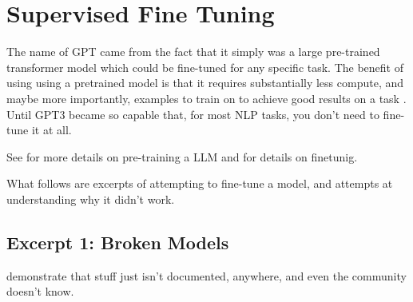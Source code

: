 



\section{Supervised Fine Tuning}\label{sec:sft}
The name of \acrfull{GPT} came from the fact that it simply was a large pre-trained transformer model which could be fine-tuned for any specific task.
The benefit of using using a pretrained model is that it requires substantially less compute, and maybe more importantly, examples to train on to achieve good results on a task \cite{gaddipati_comparative_2020}.
Until \gls{GPT3} became so capable that, for most \gls{NLP} tasks, you don't need to fine-tune it at all.

See  for more details on pre-training a \gls{LLM} and  for details on finetunig.

What follows are excerpts of attempting to fine-tune a model, and attempts at understanding why it didn't work.

\subsection{Excerpt 1: Broken Models}\label{sub:brokenft}
demonstrate that stuff just isn't documented, anywhere, and even the community doesn't know.

